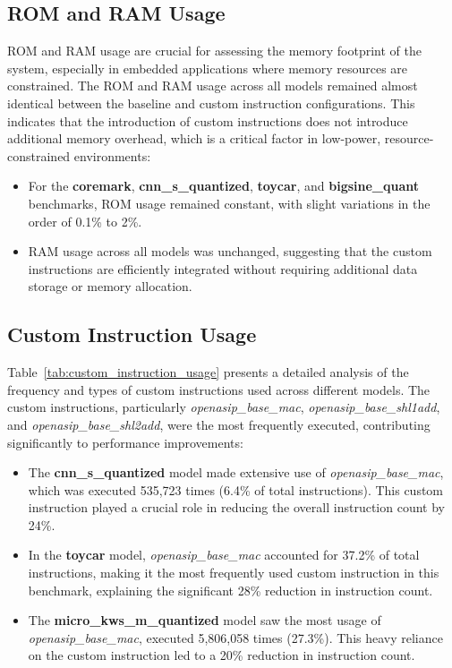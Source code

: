 \subsection{ROM and RAM Usage}
ROM and RAM usage are crucial for assessing the memory footprint of the system, especially in embedded applications where memory resources are constrained. The ROM and RAM usage across all models remained almost identical between the baseline and custom instruction configurations. This indicates that the introduction of custom instructions does not introduce additional memory overhead, which is a critical factor in low-power, resource-constrained environments:

\begin{itemize}
    \item For the \textbf{coremark}, \textbf{cnn\_s\_quantized}, \textbf{toycar}, and \textbf{bigsine\_quant} benchmarks, ROM usage remained constant, with slight variations in the order of 0.1\% to 2\%.
    \item RAM usage across all models was unchanged, suggesting that the custom instructions are efficiently integrated without requiring additional data storage or memory allocation.
\end{itemize}

\subsection{Custom Instruction Usage}
Table~\ref{tab:custom_instruction_usage} presents a detailed analysis of the frequency and types of custom instructions used across different models. The custom instructions, particularly \textit{openasip\_base\_mac}, \textit{openasip\_base\_shl1add}, and \textit{openasip\_base\_shl2add}, were the most frequently executed, contributing significantly to performance improvements:

\begin{itemize}
    \item The \textbf{cnn\_s\_quantized} model made extensive use of \textit{openasip\_base\_mac}, which was executed 535,723 times (6.4\% of total instructions). This custom instruction played a crucial role in reducing the overall instruction count by 24\%.
    \item In the \textbf{toycar} model, \textit{openasip\_base\_mac} accounted for 37.2\% of total instructions, making it the most frequently used custom instruction in this benchmark, explaining the significant 28\% reduction in instruction count.
    \item The \textbf{micro\_kws\_m\_quantized} model saw the most usage of \textit{openasip\_base\_mac}, executed 5,806,058 times (27.3\%). This heavy reliance on the custom instruction led to a 20\% reduction in instruction count.
\end{itemize}

